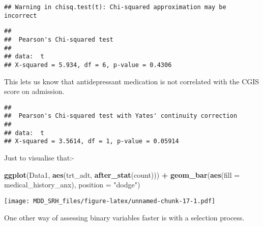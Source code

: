 \documentclass[
]{article}
\newenvironment{Shaded}{\begin{snugshade}}{\end{snugshade}}
\newcommand{\AttributeTok}[1]{\textcolor[rgb]{0.13,0.29,0.53}{#1}}
\newcommand{\FunctionTok}[1]{\textcolor[rgb]{0.13,0.29,0.53}{\textbf{#1}}}
\newcommand{\NormalTok}[1]{#1}
\newcommand{\OtherTok}[1]{\textcolor[rgb]{0.56,0.35,0.01}{#1}}
\newcommand{\SpecialCharTok}[1]{\textcolor[rgb]{0.81,0.36,0.00}{\textbf{#1}}}
\newcommand{\StringTok}[1]{\textcolor[rgb]{0.31,0.60,0.02}{#1}}
\begin{document}
\begin{verbatim}
## Warning in chisq.test(t): Chi-squared approximation may be incorrect
\end{verbatim}

\begin{verbatim}
## 
##  Pearson's Chi-squared test
## 
## data:  t
## X-squared = 5.934, df = 6, p-value = 0.4306
\end{verbatim}

This lets us know that antidepressant medication is not correlated with
the CGIS score on admission.

\begin{Shaded}
\end{Shaded}

\begin{verbatim}
## 
##  Pearson's Chi-squared test with Yates' continuity correction
## 
## data:  t
## X-squared = 3.5614, df = 1, p-value = 0.05914
\end{verbatim}

Just to visualise that:-

\begin{Shaded}
\begin{Highlighting}[]
\FunctionTok{ggplot}\NormalTok{(Data1, }\FunctionTok{aes}\NormalTok{(trt\_adt, }\FunctionTok{after\_stat}\NormalTok{(count))) }\SpecialCharTok{+} \FunctionTok{geom\_bar}\NormalTok{(}\FunctionTok{aes}\NormalTok{(}\AttributeTok{fill =}\NormalTok{ medical\_history\_anx), }\AttributeTok{position =} \StringTok{"dodge"}\NormalTok{)}
\end{Highlighting}
\end{Shaded}

\texttt{[image: MDD\_SRH\_files/figure-latex/unnamed-chunk-17-1.pdf]}

One other way of assessing binary variables faster is with a selection
process.
\end{document}

